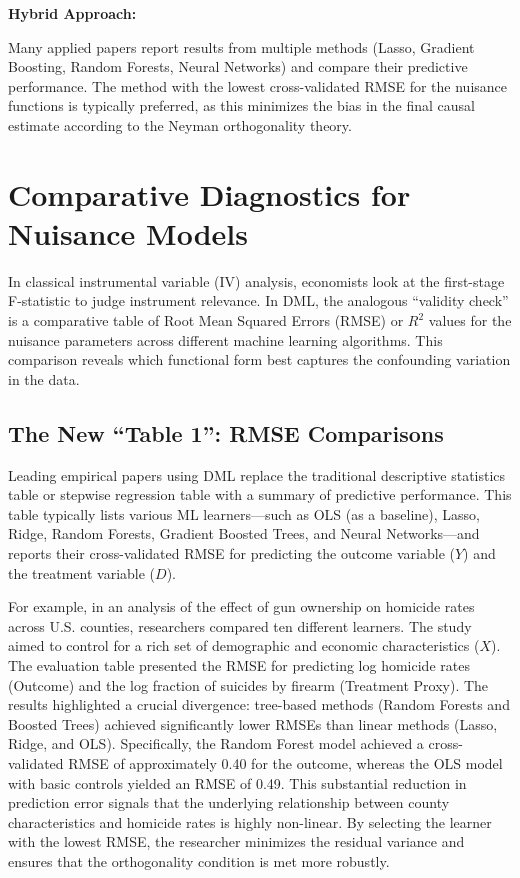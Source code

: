 \documentclass[12pt,a4paper]{article}
\begin{document}
\textbf{Hybrid Approach:}

Many applied papers report results from multiple methods (Lasso, Gradient Boosting, Random Forests, Neural Networks) and compare their predictive performance. The method with the lowest cross-validated RMSE for the nuisance functions is typically preferred, as this minimizes the bias in the final causal estimate according to the Neyman orthogonality theory.

\section{Comparative Diagnostics for Nuisance Models}

In classical instrumental variable (IV) analysis, economists look at the first-stage F-statistic to judge instrument relevance. In DML, the analogous ``validity check'' is a comparative table of Root Mean Squared Errors (RMSE) or $R^2$ values for the nuisance parameters across different machine learning algorithms. This comparison reveals which functional form best captures the confounding variation in the data.

\subsection{The New ``Table 1'': RMSE Comparisons}

Leading empirical papers using DML replace the traditional descriptive statistics table or stepwise regression table with a summary of predictive performance. This table typically lists various ML learners---such as OLS (as a baseline), Lasso, Ridge, Random Forests, Gradient Boosted Trees, and Neural Networks---and reports their cross-validated RMSE for predicting the outcome variable ($Y$) and the treatment variable ($D$).

For example, in an analysis of the effect of gun ownership on homicide rates across U.S. counties, researchers compared ten different learners. The study aimed to control for a rich set of demographic and economic characteristics ($X$). The evaluation table presented the RMSE for predicting log homicide rates (Outcome) and the log fraction of suicides by firearm (Treatment Proxy). The results highlighted a crucial divergence: tree-based methods (Random Forests and Boosted Trees) achieved significantly lower RMSEs than linear methods (Lasso, Ridge, and OLS). Specifically, the Random Forest model achieved a cross-validated RMSE of approximately 0.40 for the outcome, whereas the OLS model with basic controls yielded an RMSE of 0.49. This substantial reduction in prediction error signals that the underlying relationship between county characteristics and homicide rates is highly non-linear. By selecting the learner with the lowest RMSE, the researcher minimizes the residual variance and ensures that the orthogonality condition is met more robustly.
\end{document}

